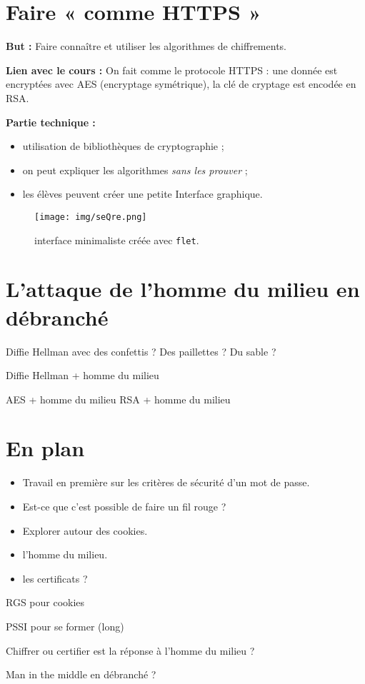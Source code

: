 \documentclass[12pt]{scrartcl}
\begin{document}
\section{Faire  «  comme HTTPS  »  }
\textbf{But :} Faire connaître et utiliser les algorithmes de chiffrements.

\textbf{Lien avec le cours :} On fait comme le protocole HTTPS : une donnée est encryptées avec AES (encryptage symétrique), la clé de cryptage est encodée en RSA.

\textbf{Partie technique :}
\begin{itemize}
    \item utilisation de bibliothèques de cryptographie ;
    \item on peut expliquer les algorithmes \textit{sans les prouver} ;
    \item les élèves peuvent créer une petite Interface graphique.
\end{itemize}


\begin{figure}[H]
    \begin{center}
        \texttt{[image: img/seQre.png]}
    \end{center}
    \caption{interface minimaliste créée avec \texttt{flet}.}
\end{figure}

\section{L'attaque de l'homme du milieu en débranché}

Diffie Hellman avec des confettis ? Des paillettes ? Du sable ?

Diffie Hellman + homme du milieu

AES + homme du milieu
RSA + homme du milieu 



\section{En plan}
\begin{itemize}
    \item Travail en première sur les critères de sécurité d'un mot de passe.
    \item Est-ce que c'est possible de faire un fil rouge ?
    \item Explorer autour des cookies.
    \item l'homme du milieu.
    \item les certificats ?
\end{itemize}
RGS pour cookies

PSSI pour se former (long)

Chiffrer ou certifier est la réponse à l'homme du milieu ?

Man in the middle en débranché ?
\end{document}
